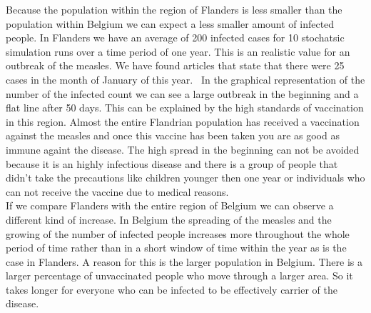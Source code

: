 \documentclass[runningheads]{llncs}
\begin{document}
	Because the population within the region of Flanders is less smaller than the population within Belgium we can expect a less smaller amount of infected people. In Flanders we have an average of 200 infected cases for 10 stochatsic simulation runs over a time period of one year. This is an realistic value for an outbreak of the measles. We have found articles that state that there were 25 cases in the month of January of this year.~\cite{article_standaard} In the graphical representation of the number of the infected count we can see a large outbreak in the beginning and a flat line after 50 days. This can be explained by the high standards of vaccination in this region. Almost the entire Flandrian population has received a vaccination against the measles and once this vaccine has been taken you are as good as immune againt the disease. The high spread in the beginning can not be avoided because it is an highly infectious disease and there is a group of people that didn't take the precautions like children younger then one year or individuals who can not receive the vaccine due to medical reasons.~\cite{url_measles_info} \\
	
	If we compare Flanders with the entire region of Belgium we can observe a different kind of increase. In Belgium the spreading of the measles and the growing of the number of infected people increases more throughout the whole period of time rather than in a short window of time within the year as is the case in Flanders. A reason for this is the larger population in Belgium. There is a larger percentage of unvaccinated people who move through a larger area. So it takes longer for everyone who can be infected to be effectively carrier of the disease.
	
\end{document}
